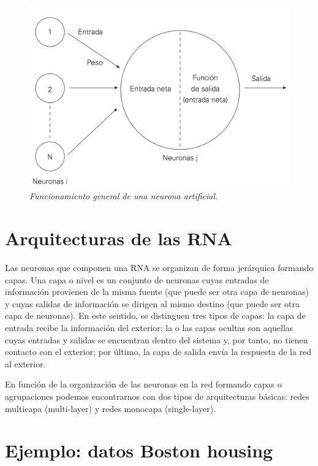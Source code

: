 \documentclass[]{book}
\begin{document}
\begin{figure}
\centering
\includegraphics{figures/neurona_artificial.png}
\caption{\emph{Funcionamiento general de una neurona artificial.}}
\end{figure}

\section{Arquitecturas de las RNA}\label{arquitecturas-de-las-rna}

Las neuronas que componen una RNA se organizan de forma jerárquica
formando capas. Una capa o nivel es un conjunto de neuronas cuyas
entradas de información provienen de la misma fuente (que puede ser otra
capa de neuronas) y cuyas salidas de información se dirigen al mismo
destino (que puede ser otra capa de neuronas). En este sentido, se
distinguen tres tipos de capas: la capa de entrada recibe la información
del exterior; la o las capas ocultas son aquellas cuyas entradas y
salidas se encuentran dentro del sistema y, por tanto, no tienen
contacto con el exterior; por último, la capa de salida envía la
respuesta de la red al exterior.

En función de la organización de las neuronas en la red formando capas o
agrupaciones podemos encontrarnos con dos tipos de arquitecturas
básicas: redes multicapa (multi-layer) y redes monocapa (single-layer).

\section{Ejemplo: datos Boston
housing}\label{ejemplo-datos-boston-housing}
\end{document}
